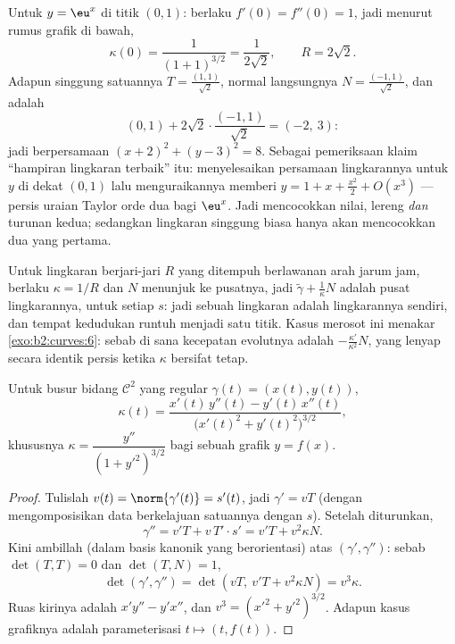 \begin{example}\label{ex:b2:curves:oscexp}
Untuk $y = \eu^x$ di titik $(0, 1)$: berlaku $f'(0) = f''(0) = 1$,
jadi menurut rumus grafik di bawah,
\[
\kappa(0) = \frac{1}{(1 + 1)^{3/2}} = \frac1{2\sqrt2},
\qquad R = 2\sqrt2 .
\]
Adapun singgung satuannya $T = \frac{(1, 1)}{\sqrt2}$, normal
langsungnya $N = \frac{(-1, 1)}{\sqrt2}$, dan  adalah
\[
(0, 1) + 2\sqrt2\cdot\frac{(-1, 1)}{\sqrt2} = (-2,\ 3) :
\]
jadi  berpersamaan $(x + 2)^2 + (y - 3)^2 =
8$. Sebagai pemeriksaan klaim ``hampiran lingkaran terbaik'' itu:
menyelesaikan persamaan lingkarannya untuk $y$ di dekat $(0,1)$ lalu
menguraikannya memberi $y = 1 + x + \frac{x^2}2 + O(x^3)$ ---
persis uraian Taylor orde dua bagi $\eu^x$. Jadi
 mencocokkan nilai, lereng \emph{dan} turunan
kedua; sedangkan lingkaran singgung biasa hanya akan mencocokkan
dua yang pertama.
\end{example}

\begin{example}\label{ex:b2:curves:circleevolute}
Untuk lingkaran berjari-jari $R$ yang ditempuh berlawanan arah jarum jam,
berlaku $\kappa = 1/R$ dan $N$ menunjuk ke pusatnya, jadi
 $\tilde\gamma + \frac1\kappa N$ adalah
pusat lingkarannya, untuk setiap $s$: jadi 
sebuah lingkaran adalah lingkarannya sendiri, dan tempat kedudukan  runtuh menjadi satu titik. Kasus merosot ini
menakar \cref{exo:b2:curves:6}: sebab di sana kecepatan evolutnya
adalah $-\frac{\kappa'}{\kappa^2}N$, yang lenyap
secara identik persis ketika $\kappa$ bersifat tetap.
\end{example}

\begin{proposition}\label{prop:b2:curves:kappaformula}
Untuk busur bidang $\mathcal{C}^2$ yang regular $\gamma(t) = (x(t), y(t))$,
\[
\kappa(t)
= \frac{x'(t)\,y''(t) - y'(t)\,x''(t)}
       {\bigl(x'(t)^2 + y'(t)^2\bigr)^{3/2}} ,
\]
khususnya $\kappa = \dfrac{y''}{(1 + y'^2)^{3/2}}$ bagi sebuah grafik
$y = f(x)$.
\end{proposition}

\begin{proof}
Tulislah $v(t) = \norm{\gamma'(t)} = s'(t)$, jadi $\gamma' = vT$
(dengan mengomposisikan data berkelajuan satuannya dengan $s$). Setelah diturunkan,
\[
\gamma'' = v'T + v\,T'\cdot s' = v'T + v^2\kappa N .
\]
Kini ambillah  (dalam basis kanonik yang berorientasi) atas
$(\gamma', \gamma'')$: sebab $\det(T, T) = 0$ dan $\det(T, N) = 1$,
\[
\det(\gamma', \gamma'') = \det(vT,\ v'T + v^2\kappa N)
= v^3\kappa .
\]
Ruas kirinya adalah $x'y'' - y'x''$, dan $v^3 = (x'^2 +
y'^2)^{3/2}$. Adapun kasus grafiknya adalah parameterisasi $t \mapsto (t,
f(t))$.
\end{proof}

